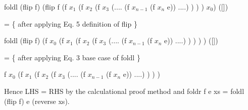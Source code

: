 \documentclass[twocolumn]{revtex4}
\begin{document}
	 foldl (flip f) (flip f (f $x_{1}$ (f $x_{2}$ (f $x_{3}$ (.... (f $x_{n-1}$ (f $x_{n}$ e)) ....) ) ) ) $x_{0}$) ([])

	 = \{ after applying Eq. 5 definition of flip \}
	 
	 foldl (flip f) (f $x_{0}$ (f $x_{1}$ (f $x_{2}$ (f $x_{3}$ (.... (f $x_{n-1}$ (f $x_{n}$ e)) ....) ) ) ) ) ([])

	 = \{ after applying Eq. 3 base case of foldl \}
	 
	 f $x_{0}$ (f $x_{1}$ (f $x_{2}$ (f $x_{3}$ (.... (f $x_{n-1}$ (f $x_{n}$ e)) ....) ) ) )
	 
	 
	
	
	Hence LHS = RHS by the calculational proof method and foldr f e xs = foldl (flip f) e (reverse xs).

	
	


{
\footnotesize

\addtolength{\itemsep}{-2mm}

}
\end{document}
